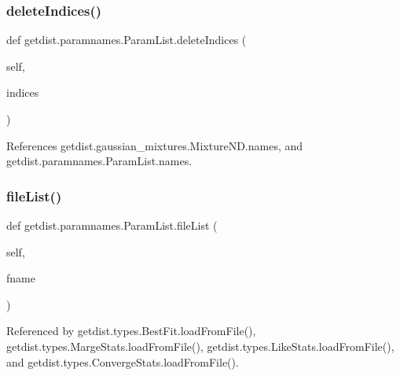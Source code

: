 \subsubsection{\texorpdfstring{delete\+Indices()}{deleteIndices()}}
{\footnotesize\ttfamily def getdist.\+paramnames.\+Param\+List.\+delete\+Indices (\begin{DoxyParamCaption}\item[{}]{self,  }\item[{}]{indices }\end{DoxyParamCaption})}



References getdist.\+gaussian\+\_\+mixtures.\+Mixture\+N\+D.\+names, and getdist.\+paramnames.\+Param\+List.\+names.

\mbox{\label{classgetdist_1_1paramnames_1_1ParamList_a96e124851867f3679768756bb4dbd4c3}} 
\subsubsection{\texorpdfstring{file\+List()}{fileList()}}
{\footnotesize\ttfamily def getdist.\+paramnames.\+Param\+List.\+file\+List (\begin{DoxyParamCaption}\item[{}]{self,  }\item[{}]{fname }\end{DoxyParamCaption})}



Referenced by getdist.\+types.\+Best\+Fit.\+load\+From\+File(), getdist.\+types.\+Marge\+Stats.\+load\+From\+File(), getdist.\+types.\+Like\+Stats.\+load\+From\+File(), and getdist.\+types.\+Converge\+Stats.\+load\+From\+File().

